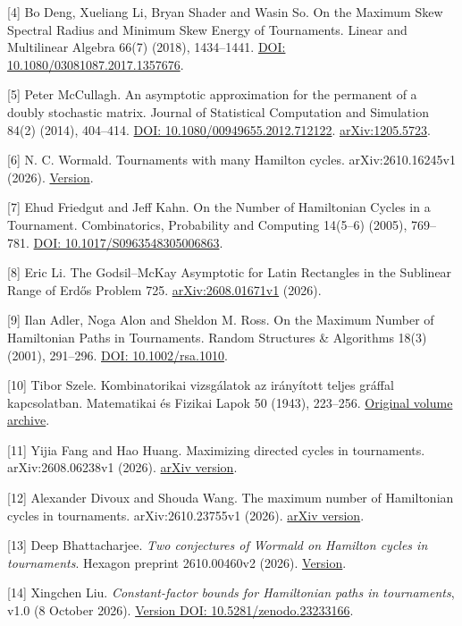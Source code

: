 \documentclass[11pt,a4paper]{article}
\begin{document}
{[}4{]} Bo Deng, Xueliang Li, Bryan Shader and Wasin So. On the Maximum Skew Spectral Radius and Minimum Skew Energy of Tournaments. Linear and Multilinear Algebra 66(7) (2018), 1434--1441. \href{https://doi.org/10.1080/03081087.2017.1357676}{DOI: 10.1080/03081087.2017.1357676}.

{[}5{]} Peter McCullagh. An asymptotic approximation for the permanent of a doubly stochastic matrix. Journal of Statistical Computation and Simulation 84(2) (2014), 404--414. \href{https://doi.org/10.1080/00949655.2012.712122}{DOI: 10.1080/00949655.2012.712122}. \href{https://arxiv.org/abs/1205.5723}{arXiv:1205.5723}.

{[}6{]} N. C. Wormald. Tournaments with many Hamilton cycles. arXiv:2610.16245v1 (2026). \href{https://arxiv.org/html/2610.16245v1}{Version}.

{[}7{]} Ehud Friedgut and Jeff Kahn. On the Number of Hamiltonian Cycles in a Tournament. Combinatorics, Probability and Computing 14(5--6) (2005), 769--781. \href{https://doi.org/10.1017/S0963548305006863}{DOI: 10.1017/S0963548305006863}.

{[}8{]} Eric Li. The Godsil--McKay Asymptotic for Latin Rectangles in the Sublinear Range of Erdős Problem 725. \href{https://arxiv.org/html/2608.01671v1}{arXiv:2608.01671v1} (2026).

{[}9{]} Ilan Adler, Noga Alon and Sheldon M. Ross. On the Maximum Number of Hamiltonian Paths in Tournaments. Random Structures \& Algorithms 18(3) (2001), 291--296. \href{https://doi.org/10.1002/rsa.1010}{DOI: 10.1002/rsa.1010}.

{[}10{]} Tibor Szele. Kombinatorikai vizsgálatok az irányított teljes gráffal kapcsolatban. Matematikai és Fizikai Lapok 50 (1943), 223--256. \href{https://real-j.mtak.hu/7300/}{Original volume archive}.

{[}11{]} Yijia Fang and Hao Huang. Maximizing directed cycles in tournaments. arXiv:2608.06238v1 (2026). \href{https://arxiv.org/html/2608.06238v1\#S3}{arXiv version}.

{[}12{]} Alexander Divoux and Shouda Wang. The maximum number of Hamiltonian cycles in tournaments. arXiv:2610.23755v1 (2026). \href{https://arxiv.org/html/2610.23755v1}{arXiv version}.

{[}13{]} Deep Bhattacharjee. \emph{Two conjectures of Wormald on Hamilton cycles in tournaments}. Hexagon preprint 2610.00460v2 (2026). \href{https://hexagonmath.org/2610.00460v2}{Version}.

{[}14{]} Xingchen Liu. \emph{Constant-factor bounds for Hamiltonian paths in tournaments}, v1.0 (8 October 2026). \href{https://doi.org/10.5281/zenodo.23233166}{Version DOI: 10.5281/zenodo.23233166}.
\end{document}
